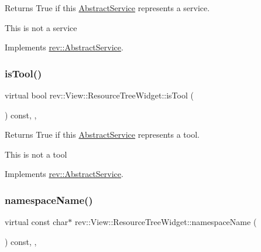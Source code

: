 Returns True if this \mbox{\hyperlink{classrev_1_1_abstract_service}{Abstract\+Service}} represents a service. 

This is not a service 

Implements \mbox{\hyperlink{classrev_1_1_abstract_service_a2ee1ad1b9d10a1d702d0a484e214b99d}{rev\+::\+Abstract\+Service}}.

\mbox{\label{classrev_1_1_view_1_1_resource_tree_widget_a22ed2556068aa97cf838094d5e2fb7e1}} 
\subsubsection{\texorpdfstring{isTool()}{isTool()}}
{\footnotesize\ttfamily virtual bool rev\+::\+View\+::\+Resource\+Tree\+Widget\+::is\+Tool (\begin{DoxyParamCaption}{ }\end{DoxyParamCaption}) const\hspace{0.3cm}{\ttfamily [inline]}, {\ttfamily [override]}, {\ttfamily [virtual]}}



Returns True if this \mbox{\hyperlink{classrev_1_1_abstract_service}{Abstract\+Service}} represents a tool. 

This is not a tool 

Implements \mbox{\hyperlink{classrev_1_1_abstract_service_aeb245a6d33601ccb842f4c7c2a3dda7a}{rev\+::\+Abstract\+Service}}.

\mbox{\label{classrev_1_1_view_1_1_resource_tree_widget_a4255d4ec5631ed643a2248c7ce6a109f}} 
\subsubsection{\texorpdfstring{namespaceName()}{namespaceName()}}
{\footnotesize\ttfamily virtual const char$\ast$ rev\+::\+View\+::\+Resource\+Tree\+Widget\+::namespace\+Name (\begin{DoxyParamCaption}{ }\end{DoxyParamCaption}) const\hspace{0.3cm}{\ttfamily [inline]}, {\ttfamily [override]}, {\ttfamily [virtual]}}



